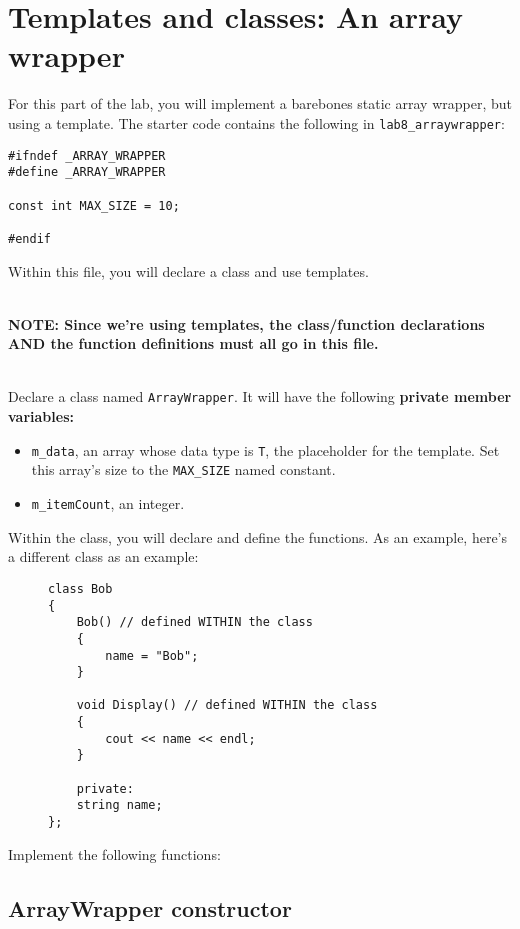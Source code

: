 \documentclass[a4paper,12pt,oneside]{book}
\begin{document}
    \section{Templates and classes: An array wrapper}

    For this part of the lab, you will implement a barebones static
    array wrapper, but using a template.
    The starter code contains the following in \texttt{lab8\_arraywrapper}:
    
\begin{lstlisting}[style=code]
#ifndef _ARRAY_WRAPPER
#define _ARRAY_WRAPPER

const int MAX_SIZE = 10;

#endif   
\end{lstlisting}

Within this file, you will declare a class and use templates.

~\\
\textbf{
NOTE: Since we're using templates, the class/function declarations
AND the function definitions must all go in this file.
}

~\\
Declare a class named \texttt{ArrayWrapper}. It will have the following
\textbf{private member variables:}

\begin{itemize}
    \item   \texttt{m\_data}, an array whose data type is \texttt{T}, the placeholder for the template. Set this array's size to the \texttt{MAX\_SIZE} named constant.
    \item   \texttt{m\_itemCount}, an integer.
\end{itemize}

Within the class, you will declare and define the functions. As an example,
here's a different class as an example:

\begin{figure}[h]
\centering
\begin{BVerbatim}
class Bob
{
    Bob() // defined WITHIN the class
    {
        name = "Bob";
    }

    void Display() // defined WITHIN the class
    {
        cout << name << endl;
    }

    private:
    string name;
};
\end{BVerbatim}
\end{figure}

Implement the following functions:

    \subsection{ArrayWrapper constructor}
\end{document}
